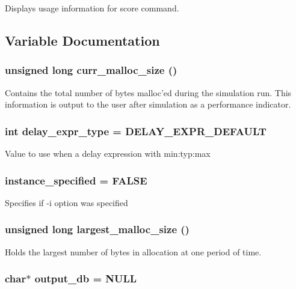 Displays usage information for score command. 

\subsection{Variable Documentation}
\subsubsection{\setlength{\rightskip}{0pt plus 5cm}unsigned long {\bf curr\_\-malloc\_\-size} ()}\label{score_8c_a9}


Contains the total number of bytes malloc'ed during the simulation run. This information is output to the user after simulation as a performance indicator. 
\subsubsection{\setlength{\rightskip}{0pt plus 5cm}int {\bf delay\_\-expr\_\-type} = DELAY\_\-EXPR\_\-DEFAULT}\label{score_8c_a4}


Value to use when a delay expression with min:typ:max 
\subsubsection{ {\bf instance\_\-specified} = FALSE}\label{score_8c_a6}


Specifies if -i option was specified 
\subsubsection{\setlength{\rightskip}{0pt plus 5cm}unsigned long {\bf largest\_\-malloc\_\-size} ()}\label{score_8c_a8}


Holds the largest number of bytes in allocation at one period of time. 
\subsubsection{\setlength{\rightskip}{0pt plus 5cm}char$\ast$ {\bf output\_\-db} = NULL}\label{score_8c_a2}



